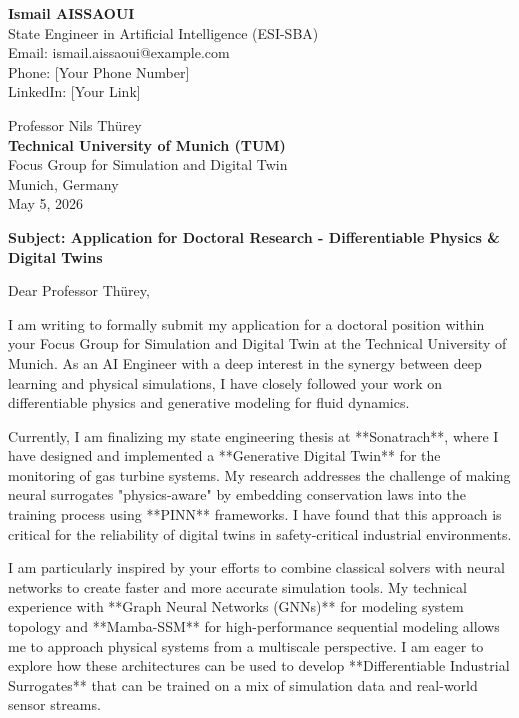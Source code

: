 \documentclass[11pt,a4paper]{article}
\begin{document}
\noindent \textbf{Ismail AISSAOUI} \\
State Engineer in Artificial Intelligence (ESI-SBA) \\
Email: ismail.aissaoui@example.com \\
Phone: [Your Phone Number] \\
LinkedIn: [Your Link]

\bigskip

\begin{flushright}
    Professor Nils Thürey \\
    \textbf{Technical University of Munich (TUM)} \\
    Focus Group for Simulation and Digital Twin \\
    Munich, Germany \\
    \medskip
    May 5, 2026
\end{flushright}

\bigskip

\noindent \textbf{Subject: Application for Doctoral Research - Differentiable Physics \& Digital Twins}

\bigskip

Dear Professor Thürey,

I am writing to formally submit my application for a doctoral position within your Focus Group for Simulation and Digital Twin at the Technical University of Munich. As an AI Engineer with a deep interest in the synergy between deep learning and physical simulations, I have closely followed your work on differentiable physics and generative modeling for fluid dynamics.

Currently, I am finalizing my state engineering thesis at **Sonatrach**, where I have designed and implemented a **Generative Digital Twin** for the monitoring of gas turbine systems. My research addresses the challenge of making neural surrogates "physics-aware" by embedding conservation laws into the training process using **PINN** frameworks. I have found that this approach is critical for the reliability of digital twins in safety-critical industrial environments.

I am particularly inspired by your efforts to combine classical solvers with neural networks to create faster and more accurate simulation tools. My technical experience with **Graph Neural Networks (GNNs)** for modeling system topology and **Mamba-SSM** for high-performance sequential modeling allows me to approach physical systems from a multiscale perspective. I am eager to explore how these architectures can be used to develop **Differentiable Industrial Surrogates** that can be trained on a mix of simulation data and real-world sensor streams.
\end{document}
